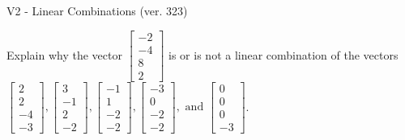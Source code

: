 \begin{exercise}
  \begin{exerciseTitle}V2 - Linear Combinations (ver. 323)\end{exerciseTitle}
  \begin{exerciseStatement}
    Explain why the vector \(\left[\begin{array}{c}
-2 \\
-4 \\
8 \\
2
\end{array}\right]\)  is or is not a linear 
	combination of the vectors \(\left[\begin{array}{c}
2 \\
2 \\
-4 \\
-3
\end{array}\right] , \left[\begin{array}{c}
3 \\
-1 \\
2 \\
-2
\end{array}\right] , \left[\begin{array}{c}
-1 \\
1 \\
-2 \\
-2
\end{array}\right] , \left[\begin{array}{c}
-3 \\
0 \\
-2 \\
-2
\end{array}\right] , \text{ and } \left[\begin{array}{c}
0 \\
0 \\
0 \\
-3
\end{array}\right]\).
	



\end{exerciseStatement}
\end{exercise}
